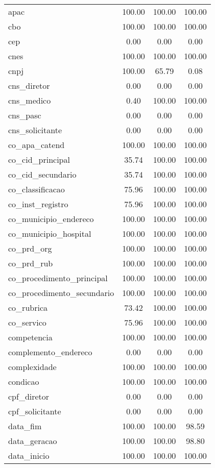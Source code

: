 \documentclass[
  12,
  table]{proadi}
\begin{document}
\begin{longtable}{lccc}
\endfoot
\bottomrule
\endlastfoot
apac & 100.00 & 100.00 & 100.00\\
cbo & 100.00 & 100.00 & 100.00\\
cep & 0.00 & 0.00 & 0.00\\
cnes & 100.00 & 100.00 & 100.00\\
cnpj & 100.00 & 65.79 & 0.08\\
\addlinespace
cns\_diretor & 0.00 & 0.00 & 0.00\\
cns\_medico & 0.40 & 100.00 & 100.00\\
cns\_pasc & 0.00 & 0.00 & 0.00\\
cns\_solicitante & 0.00 & 0.00 & 0.00\\
co\_apa\_catend & 100.00 & 100.00 & 100.00\\
\addlinespace
co\_cid\_principal & 35.74 & 100.00 & 100.00\\
co\_cid\_secundario & 35.74 & 100.00 & 100.00\\
co\_classificacao & 75.96 & 100.00 & 100.00\\
co\_inst\_registro & 75.96 & 100.00 & 100.00\\
co\_municipio\_endereco & 100.00 & 100.00 & 100.00\\
\addlinespace
co\_municipio\_hospital & 100.00 & 100.00 & 100.00\\
co\_prd\_org & 100.00 & 100.00 & 100.00\\
co\_prd\_rub & 100.00 & 100.00 & 100.00\\
co\_procedimento\_principal & 100.00 & 100.00 & 100.00\\
co\_procedimento\_secundario & 100.00 & 100.00 & 100.00\\
\addlinespace
co\_rubrica & 73.42 & 100.00 & 100.00\\
co\_servico & 75.96 & 100.00 & 100.00\\
competencia & 100.00 & 100.00 & 100.00\\
complemento\_endereco & 0.00 & 0.00 & 0.00\\
complexidade & 100.00 & 100.00 & 100.00\\
\addlinespace
condicao & 100.00 & 100.00 & 100.00\\
cpf\_diretor & 0.00 & 0.00 & 0.00\\
cpf\_solicitante & 0.00 & 0.00 & 0.00\\
data\_fim & 100.00 & 100.00 & 98.59\\
data\_geracao & 100.00 & 100.00 & 98.80\\
\addlinespace
data\_inicio & 100.00 & 100.00 & 100.00\\

\end{longtable}
\end{document}
